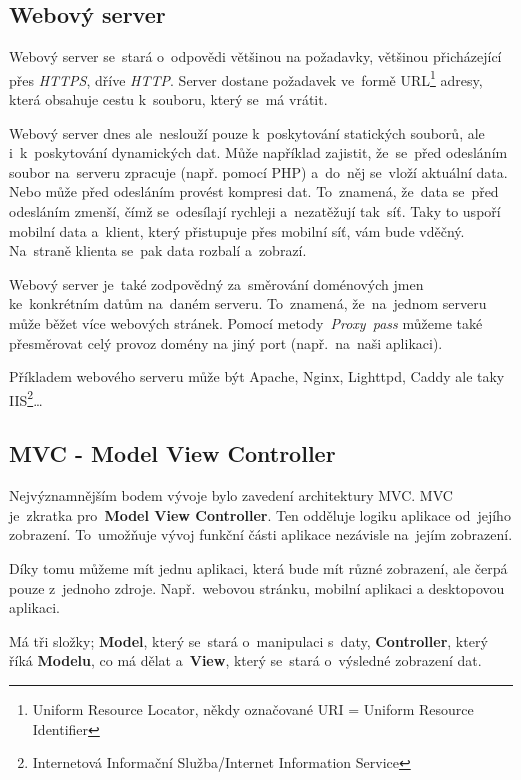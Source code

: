 \documentclass[14pt,a4paper]{article}
\begin{document}
        \subsection{Webový server}
        Webový server se~stará o~odpovědi většinou na požadavky, většinou přicházející přes \emph{HTTPS}, dříve \emph{HTTP}.
        Server dostane požadavek ve~formě URL\footnote{Uniform Resource Locator, někdy označované URI = Uniform Resource Identifier} adresy,
        která obsahuje cestu k~souboru, který se~má vrátit.

        Webový server dnes ale~neslouží pouze k~poskytování statických souborů, ale i~k~poskytování dynamických dat.
        Může například zajistit, že~se~před odesláním soubor na~serveru zpracuje (např. pomocí PHP) a~do~něj se~vloží aktuální data.
        Nebo může před odesláním provést kompresi dat. To~znamená, že~data se~před odesláním zmenší, čímž se~odesílají rychleji a~nezatěžují
        tak~síť. Taky to uspoří mobilní data a~klient, který přistupuje přes mobilní síť, vám bude vděčný. Na~straně klienta se~pak data rozbalí a~zobrazí.

        Webový server je~také zodpovědný za~směrování doménových jmen ke~konkrétním datům na~daném serveru. To~znamená, že~na~jednom serveru může běžet více webových stránek.
        Pomocí metody~\emph{Proxy~pass} můžeme také přesměrovat celý provoz domény na jiný port (např.~na~naši aplikaci).

        Příkladem webového serveru může být Apache, Nginx, Lighttpd, Caddy ale taky IIS\footnote{Internetová Informační Služba/Internet Information Service}\dots

        
        \subsection{MVC - Model View Controller}
        Nejvýznamnějším bodem vývoje bylo zavedení architektury MVC. MVC je~zkratka pro~\textbf{Model View Controller}.
        Ten odděluje logiku aplikace od~jejího zobrazení. To~umožňuje vývoj funkční části aplikace nezávisle na~jejím zobrazení.

        Díky tomu můžeme mít jednu aplikaci, která bude mít různé zobrazení, ale čerpá pouze z~jednoho zdroje. Např.~webovou stránku, mobilní aplikaci a desktopovou aplikaci.

        Má tři složky; \textbf{Model}, který se~stará o~manipulaci s~daty, \textbf{Controller}, který říká \textbf{Modelu}, co má dělat
        a~\textbf{View}, který se~stará o~výsledné zobrazení dat.
\end{document}
